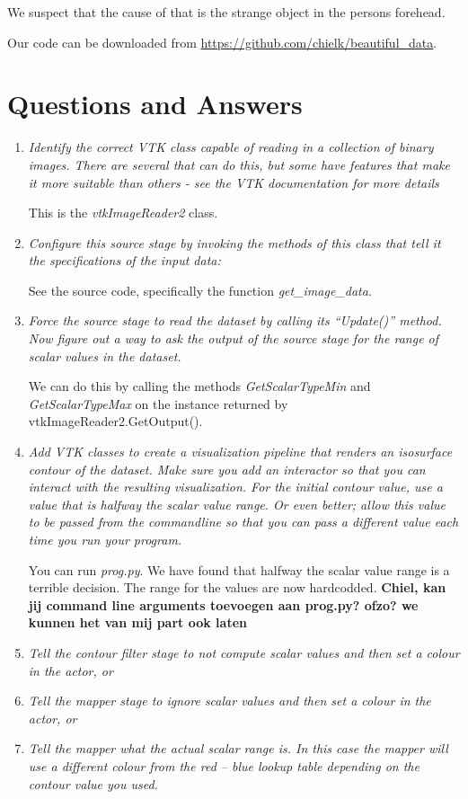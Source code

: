 \documentclass{article}[10pt]
\begin{document}
We suspect that the cause of that is the strange object in the persons forehead.

Our code can be downloaded from \url{https://github.com/chielk/beautiful_data}.

\section{Questions and Answers}
\begin{enumerate}
    \item \textit{Identify the correct VTK class capable of reading in a
collection of binary images. There are several that can do this, but some have
features that make it more suitable than others - see the VTK documentation for
more details}

This is the \emph{vtkImageReader2} class.

    \item \textit{Configure this source stage by invoking the methods of this
class that tell it the specifications of the input data:}

See the source code, specifically the function \emph{get\_image\_data}.

    \item \textit{Force the source stage to read the dataset by calling its
“Update()” method. Now figure out a way to ask the output of the source stage
for the range of scalar values in the dataset.}

We can do this by calling the methods \emph{GetScalarTypeMin} and
\textit{GetScalarTypeMax} on the instance returned by
vtkImageReader2.GetOutput().

    \item \textit{Add VTK classes to create a visualization pipeline that
renders an isosurface contour of the dataset. Make sure you add an interactor so
that you can interact with the resulting visualization. For the initial contour
value, use a value that is halfway the scalar value range.  Or even better;
allow this value to be passed from the commandline so that you can pass a
different value each time you run your program.}

You can run \emph{prog.py}. We have found that halfway the scalar value range is
a terrible decision. The range for the values are now hardcodded.
\textbf{Chiel, kan jij command line arguments toevoegen aan prog.py? ofzo? we
kunnen het van mij part ook laten}

    \item \textit{Tell the contour filter stage to not compute scalar values and
then set a colour in the actor, or}
    \item \textit{Tell the mapper stage to ignore scalar values and then set
a colour in the actor, or}
    \item \textit{Tell the mapper what the actual scalar range is. In this
case the mapper will use a different colour from the red – blue lookup table
depending on the contour value you used.}


\end{enumerate}
\end{document}
